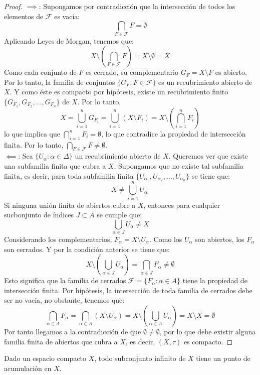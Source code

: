 \begin{proof}
    $\implies$: Supongamos por contradicción que la intersección de todos los elementos de $\mathcal{F}$ es vacía: 
    $$\bigcap_{F \in \mathcal{F}} F = \emptyset$$
    Aplicando Leyes de Morgan, tenemos que: 
    $$X \setminus (\bigcap_{F \in \mathcal{F}} F) = X \setminus \emptyset = X$$
    Como cada conjunto de $F$ es cerrado, su complementario $G_F = X \setminus F$ es abierto. Por lo tanto, la familia de conjuntos $\{G_F : F \in \mathcal{F}\}$ es un recubrimiento abierto de $X$. Y como éste es compacto por hipótesis, existe un recubrimiento finito $\{G_{F_1}, G_{F_2}, \ldots, G_{F_n}\}$ de $X$. Por lo tanto,
    $$X = \bigcup_{i=1}^n G_{F_i} = \bigcup_{i=1}^n (X \setminus F_i) = X \setminus (\bigcap_{i=1}^n F_i)$$
    lo que implica que $\bigcap_{i=1}^n F_i = \emptyset$, lo que contradice la propiedad de intersección finita. Por lo tanto, $\bigcap_{F \in \mathcal{F}} F \neq \emptyset$.\\
    $\impliedby$: Sea $\{U_{\alpha} : \alpha \in \Delta\}$ un recubrimiento abierto de $X$. Queremos ver que existe una subfamilia finita que cubra a $X$. Supongamos que no existe tal subfamilia finita, es decir, para toda subfamilia finita $\{U_{\alpha_1}, U_{\alpha_2}, \ldots, U_{\alpha_n}\}$ se tiene que:
    $$X \neq \bigcup_{i=1}^n U_{\alpha_i}$$
    Si ninguna unión finita de abiertos cubre a $X$, entonces para cualquier sucbonjunto de índices $J \subset A$ se cumple que: 
    $$\bigcup_{\alpha \in J} U_{\alpha} \neq X$$
    Considerando los complementarios, $F_{\alpha} = X \setminus U_{\alpha}$. Como los $U_{\alpha}$ son abiertos, los $F_{\alpha}$ son cerrados. Y por la condición anterior se tiene que: 
    $$X \setminus (\bigcup_{\alpha \in J} U_{\alpha}) = \bigcap_{\alpha \in J} F_{\alpha} \neq \emptyset$$
    Esto significa que la familia de cerrados $\mathcal{F} = \{F_{\alpha} : \alpha \in A\}$ tiene la propiedad de intersección finita. Por hipótesis, la intersección de toda familia de cerrados debe ser no vacía, no obstante, tenemos que: 
    $$\bigcap_{\alpha \in A} F_{\alpha} = \bigcap_{\alpha \in A} (X \setminus U_{\alpha}) = X \setminus (\bigcup_{\alpha \in A} U_{\alpha}) = X \setminus X = \emptyset$$
    Por tanto llegamos a la contradicción de que $\emptyset \neq \emptyset$, por lo que debe existir alguna familia finita de abiertos que cubra a $X$, es decir, $(X, \tau)$ es compacto.
\end{proof}
\begin{proposición}
    Dado un espacio compacto $X$, todo subconjunto infinito de $X$ tiene un punto de acumulación en $X$. 
\end{proposición}
